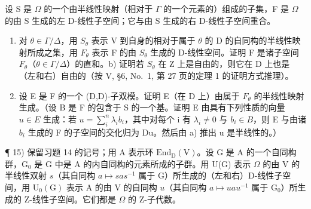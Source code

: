 设 S 是 \(\Omega\) 的一个由半线性映射（相对于 \(\Gamma\) 的一个元素的）组成的子集，F 是 \(\Omega\) 的由 S 生成的左 D-线性子空间；它与由 S 生成的右 D-线性子空间重合。

\begin{enumerate}
\def\labelenumi{\alph{enumi})}
\item
  对 \(\theta \in \Gamma / \Delta\)，用 \(S_{\theta}\) 表示 V 到自身的相对于属于 \(\theta\) 的 D 的自同构的半线性映射所成之集，用 \(F_{\theta}\) 表示 F 的由 \(S_{\theta}\) 生成的 D-线性空间。证明 F 是诸子空间 \(F_{\theta}\)（\(\theta \in \Gamma / \Delta\)）的直和。b) 证明若 \(S_{\theta}\) 在 Z 上是自由的，则它在 D 上也是（左和右）自由的（按 V, §6, No.~1, 第 27 页的定理 1 的证明方式推理）。
\item
  设 E 是 F 的一个 (D,D)-子双模。证明 E（在 D 上）由属于 \(F_{\theta}\) 的半线性映射生成。（设 B 是 F 的包含于 S 的一个基。证明 E 由具有下列性质的向量 \(u \in E\) 生成：若 \(u = \sum_{i}^{n} \lambda_{i} b_{i}\)，其中对每个 i 有 \(\lambda_{i} \neq 0\) 与 \(b_{i} \in B\)，则 E 与由诸 \(b_{i}\) 生成的 F 的子空间的交化归为 Du。然后由 a) 推出 u 是半线性的。）
\end{enumerate}

¶ 15) 保留习题 14 的记号；用 A 表示环 \(\mathrm{End}_{\mathrm{D}}(\mathrm{V})\)。设 G 是 A 的一个自同构群，\(\mathrm{G}_0\) 是 G 中是 A 的内自同构的元素所成的子群。用 U(G) 表示 \(\Omega\) 的由 V 的半线性双射 \(s\)（其自同构 \(a \mapsto sas^{-1}\) 属于 G）所生成的（左和右）D-线性子空间，用 \(\mathrm{U}_0(\mathrm{G})\) 表示 A 的由 V 的自同构 \(u\)（其自同构 \(a \mapsto uau^{-1}\) 属于 \(\mathrm{G}_0\)）所生成的 Z-线性子空间。它们都是 \(\Omega\) 的 Z-子代数。

